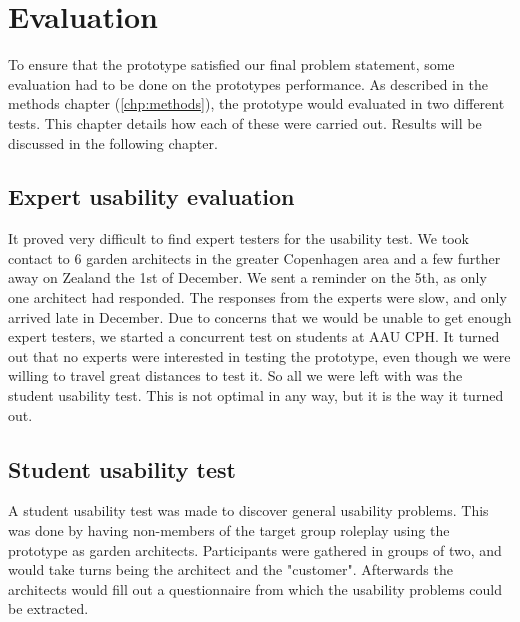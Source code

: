 \chapter{Evaluation}
To ensure that the prototype satisfied our final problem statement, some evaluation had to be done on the prototypes performance. As described in the methods chapter (\ref{chp:methods}), the prototype would evaluated in two different tests. This chapter details how each of these were carried out. Results will be discussed in the following chapter.

\section{Expert usability evaluation}
It proved very difficult to find expert testers for the usability test. We took contact to 6 garden architects in the greater Copenhagen area and a few further away on Zealand the 1st of December. We sent a reminder on the 5th, as only one architect had responded. The responses from the experts were slow, and only arrived late in December. Due to concerns that we would be unable to get enough expert testers, we started a concurrent test on students at AAU CPH. It turned out that no experts were interested in testing the prototype, even though we were willing to travel great distances to test it. So all we were left with was the student usability test. This is not optimal in any way, but it is the way it turned out.
\section{Student usability test}
A student usability test was made to discover general usability problems. This was done by having non-members of the target group roleplay using the prototype as garden architects. Participants were gathered in groups of two, and would take turns being the architect and the "customer". Afterwards the architects would fill out a questionnaire from which the usability problems could be extracted. 

